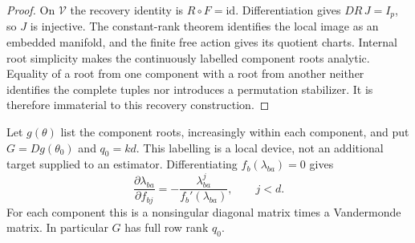 \begin{proof}
On $\mathcal V$ the recovery identity is $R\circ F=\mathrm{id}$.
Differentiation gives $DR\,J=I_p$, so $J$ is injective. The constant-rank
theorem identifies the local image as an embedded manifold, and the
finite free action gives its quotient charts. Internal root simplicity
makes the continuously labelled component roots analytic. Equality of
a root from one component with a root from another neither identifies
the complete tuples nor introduces a permutation stabilizer. It is
therefore immaterial to this recovery construction.
\end{proof}

Let $g(\theta)$ list the component roots, increasingly within each
component, and put $G=Dg(\theta_0)$ and $q_0=kd$. This labelling is a
local device, not an additional target supplied to an estimator.
Differentiating $f_b(\lambda_{ba})=0$ gives
\begin{equation}\label{eq:root-coefficient-derivative}
 \frac{\partial\lambda_{ba}}{\partial f_{bj}}
       =-\frac{\lambda_{ba}^{j}}{f_b'(\lambda_{ba})},\qquad j<d.
\end{equation}
For each component this is a nonsingular diagonal matrix times a
Vandermonde matrix. In particular $G$ has full row rank $q_0$.

